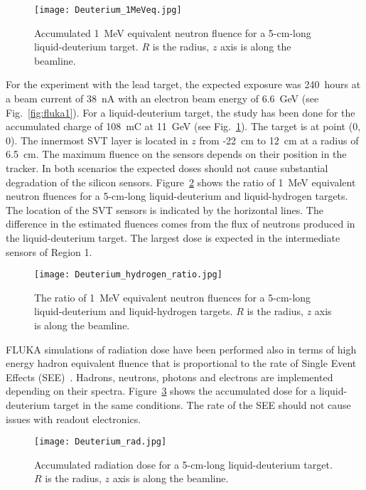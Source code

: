 \begin{figure}[hbt] 
\texttt{[image: Deuterium\_1MeVeq.jpg]}
\caption{Accumulated 1~MeV equivalent neutron fluence for a 5-cm-long liquid-deuterium target. $R$ is the radius, $z$ axis is along the beamline.}
\label{fig:fluka2}
\end{figure}

For the experiment with the lead target, the expected exposure was 240~hours at a beam current of 38~nA with an electron beam energy of 6.6~GeV (see Fig.~\ref{fig:fluka1}). For a liquid-deuterium target, the study has been done for the accumulated charge of 108~mC at 11~GeV (see Fig.~\ref{fig:fluka2}). The target is at point (0, 0). The innermost SVT layer is located in $z$ from -22~cm to 12~cm at a radius of 6.5~cm. The maximum fluence on the sensors depends on their position in the tracker. In both scenarios the expected doses should not cause substantial degradation of the silicon sensors. Figure~\ref{fig:fluka3} shows the ratio of 1~MeV equivalent neutron fluences for a 5-cm-long liquid-deuterium and liquid-hydrogen targets. The location of the SVT sensors is indicated by the horizontal lines. The difference in the estimated fluences comes from the flux of neutrons produced in the liquid-deuterium target. The largest dose is expected in the intermediate sensors of Region 1.

\begin{figure}[hbt] 
\texttt{[image: Deuterium\_hydrogen\_ratio.jpg]}
\caption{The ratio of 1~MeV equivalent neutron fluences for a 5-cm-long liquid-deuterium and liquid-hydrogen targets. $R$ is the radius, $z$ axis is along the beamline.}
\label{fig:fluka3}
\end{figure}

FLUKA simulations of radiation dose have been performed also in terms of high energy hadron equivalent fluence that is proportional to the rate of Single Event Effects (SEE)~\cite{FLUKA3}. Hadrons, neutrons, photons and electrons are implemented depending on their spectra. Figure~\ref{fig:fluka4} shows the accumulated dose for a liquid-deuterium target in the same conditions. The rate of the SEE should not cause issues with readout electronics.

\begin{figure}[hbt] 
\texttt{[image: Deuterium\_rad.jpg]}
\caption{Accumulated radiation dose for a 5-cm-long liquid-deuterium target. $R$ is the radius, $z$ axis is along the beamline.}
\label{fig:fluka4}
\end{figure}

